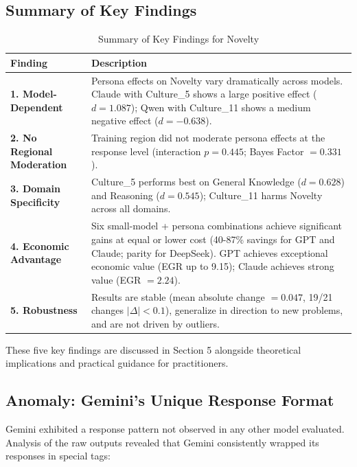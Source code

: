 \documentclass{article}
\begin{document}
\subsection{Summary of Key Findings}

\begin{table}[H]
\centering
\caption{Summary of Key Findings for Novelty}
\label{tab:key_findings_novelty}
\begin{tabular}{p{3cm}p{9.5cm}}
\toprule
\textbf{Finding} & \textbf{Description} \\
\midrule
\textbf{1. Model-Dependent} & Persona effects on Novelty vary dramatically across models. Claude with Culture\_5 shows a large positive effect ($d = 1.087$); Qwen with Culture\_11 shows a medium negative effect ($d = -0.638$). \\
\midrule
\textbf{2. No Regional Moderation} & Training region did not moderate persona effects at the response level (interaction $p = 0.445$; Bayes Factor $= 0.331$). \\
\midrule
\textbf{3. Domain Specificity} & Culture\_5 performs best on General Knowledge ($d = 0.628$) and Reasoning ($d = 0.545$); Culture\_11 harms Novelty across all domains. \\
\midrule
\textbf{4. Economic Advantage} & Six small-model + persona combinations achieve significant gains at equal or lower cost (40-87\% savings for GPT and Claude; parity for DeepSeek). GPT achieves exceptional economic value (EGR up to 9.15); Claude achieves strong value (EGR $= 2.24$). \\
\midrule
\textbf{5. Robustness} & Results are stable (mean absolute change $= 0.047$, 19/21 changes $|\Delta| < 0.1$), generalize in direction to new problems, and are not driven by outliers. \\
\bottomrule
\end{tabular}
\end{table}

These five key findings are discussed in Section 5 alongside theoretical implications and practical guidance for practitioners.

\subsection{Anomaly: Gemini's Unique Response Format}

Gemini exhibited a response pattern not observed in any other model evaluated. Analysis of the raw outputs revealed that Gemini consistently wrapped its responses in special tags:
\end{document}
